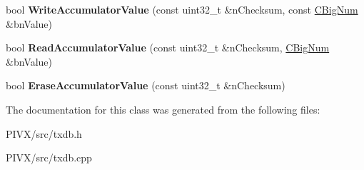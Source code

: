 \begin{DoxyCompactItemize}
bool {\bfseries Write\+Accumulator\+Value} (const uint32\+\_\+t \&n\+Checksum, const \mbox{\hyperlink{class_c_big_num}{C\+Big\+Num}} \&bn\+Value)
\item 
\mbox{\label{class_c_zerocoin_d_b_a8eb79c950d83952e2db1177c574addb5}} 
bool {\bfseries Read\+Accumulator\+Value} (const uint32\+\_\+t \&n\+Checksum, \mbox{\hyperlink{class_c_big_num}{C\+Big\+Num}} \&bn\+Value)
\item 
\mbox{\label{class_c_zerocoin_d_b_a5ab8298648ee5017ae01d054eaebae0a}} 
bool {\bfseries Erase\+Accumulator\+Value} (const uint32\+\_\+t \&n\+Checksum)
\end{DoxyCompactItemize}


The documentation for this class was generated from the following files\+:\begin{DoxyCompactItemize}
\item 
P\+I\+V\+X/src/txdb.\+h\item 
P\+I\+V\+X/src/txdb.\+cpp\end{DoxyCompactItemize}
